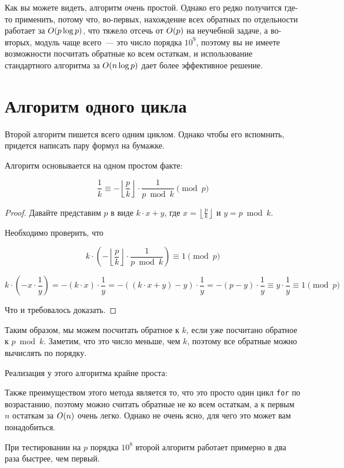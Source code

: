 Как вы можете видеть, алгоритм очень простой. Однако его редко получится где-то применить, потому что, во-первых, нахождение всех обратных по отдельности работает за $O(p \log p)$, что тяжело отсечь от $O(p)$ на неучебной задаче,
а во-вторых, модуль чаще всего~--- это число порядка $10^9$, поэтому вы не имеете возможности посчитать обратные ко всем остаткам, и использование стандартного алгоритма за $O(n \log p)$ дает более эффективное решение.


\section{Алгоритм одного цикла}

Второй алгоритм пишется всего одним циклом. Однако чтобы его вспомнить, придется написать пару формул на бумажке.

Алгоритм основывается на одном простом факте:

\begin{theorem}
    $$
    \frac{1}{k} \equiv -\left\lfloor \frac{p}{k} \right\rfloor \cdot \frac{1}{p \bmod k} \pmod p
    $$
\end{theorem}

\begin{proof}
    Давайте представим $p$ в виде $k \cdot x + y$, где $x = \left\lfloor \frac{p}{k} \right\rfloor$ и $y = p \bmod k$.

    Необходимо проверить, что

    $$k \cdot \left(-\left\lfloor \frac{p}{k} \right\rfloor \cdot \frac{1}{p \bmod k} \right) \equiv 1 \pmod p$$

    $$
    k \cdot (-x \cdot \frac{1}{y}) = - (k \cdot x) \cdot \frac{1}{y} = - \left((k \cdot x + y) - y\right) \cdot \frac{1}{y} = - (p - y) \cdot \frac{1}{y} \equiv y \cdot \frac{1}{y} \equiv 1 \pmod p
    $$

    Что и требовалось доказать.
\end{proof}

Таким образом, мы можем посчитать обратное к $k$, если уже посчитано обратное к $p \bmod k$. Заметим, что это число меньше, чем $k$,
поэтому все обратные можно вычислять по порядку.

Реализация у этого алгоритма крайне проста:



Также преимуществом этого метода является то, что это просто один цикл \verb+for+ по возрастанию, поэтому можно считать обратные не ко всем остаткам, а к первым $n$ остаткам за $O(n)$ очень легко. Однако не очень ясно, для чего это может вам понадобиться.


При тестировании на $p$ порядка $10^8$ второй алгоритм работает примерно в два раза быстрее, чем первый.



